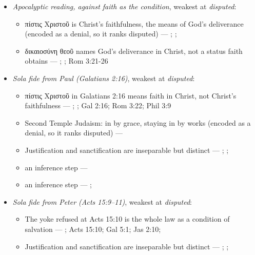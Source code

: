 \documentclass[11pt]{article}
\begin{document}
\begin{itemize}
\item \emph{Apocalyptic reading, against faith as the condition}, weakest at \emph{disputed}:
\begin{itemize}
\item πίστις Χριστοῦ is Christ's faithfulness, the means of God's deliverance (encoded as a denial, so it ranks disputed) --- \cite{campbell-deliverance-god-2009}; \cite[ad loc. Gal 2:16]{martyn-galatians-1997}; \cite{hays-faith-jesus-christ-2002}
\item δικαιοσύνη θεοῦ names God's deliverance in Christ, not a status faith obtains --- \cite{campbell-deliverance-god-2009}; \cite{martyn-galatians-1997}; Rom 3:21-26
\end{itemize}
\item \emph{Sola fide from Paul (Galatians 2:16)}, weakest at \emph{disputed}:
\begin{itemize}
\item πίστις Χριστοῦ in Galatians 2:16 means faith in Christ, not Christ's faithfulness --- \cite{dunn-once-more-pistis-christou-1991}; \cite{matlock-detheologizing-2000}; Gal 2:16; Rom 3:22; Phil 3:9
\item Second Temple Judaism: in by grace, staying in by works (encoded as a denial, so it ranks disputed) --- \cite{sanders-paul-palestinian-judaism-1977}
\item Justification and sanctification are inseparable but distinct --- \cite[XIII.1]{westminster-confession-1647}; \cite[XI.1]{westminster-confession-1647}; \cite[III.xi.6]{calvin-institutes-1960}
\item an inference step --- \cite[Trent, Session VI (1547), canon 9]{tanner-decrees-1990}
\item an inference step --- \cite{gathercole-where-boasting-2002}; \cite{carson-variegated-nomism-1-2001}
\end{itemize}
\item \emph{Sola fide from Peter (Acts 15:9–11)}, weakest at \emph{disputed}:
\begin{itemize}
\item The yoke refused at Acts 15:10 is the whole law as a condition of salvation --- \cite[ad loc. Acts 15:10]{bruce-acts-1988}; Acts 15:10; Gal 5:1; Jas 2:10; \cite{das-paul-law-covenant-2001}
\item Justification and sanctification are inseparable but distinct --- \cite[XIII.1]{westminster-confession-1647}; \cite[XI.1]{westminster-confession-1647}; \cite[III.xi.6]{calvin-institutes-1960}

\end{itemize}
\end{itemize}
\end{document}
